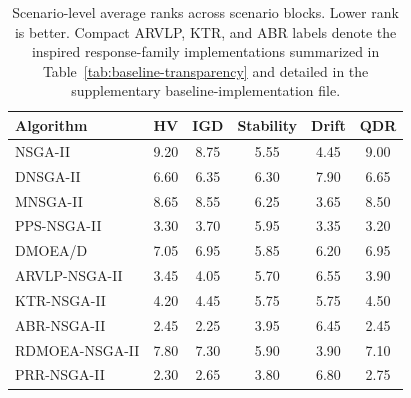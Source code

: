 \begin{table}[htbp]
\centering
\caption{Scenario-level average ranks across scenario blocks. Lower rank is better. Compact ARVLP, KTR, and ABR labels denote the inspired response-family implementations summarized in Table~\ref{tab:baseline-transparency} and detailed in the supplementary baseline-implementation file.}
\label{tab:average-ranks}
\begin{tabular}{lccccc}
\toprule
Algorithm & HV & IGD & Stability & Drift & QDR \\
\midrule
NSGA-II & 9.20 & 8.75 & 5.55 & 4.45 & 9.00 \\
DNSGA-II & 6.60 & 6.35 & 6.30 & 7.90 & 6.65 \\
MNSGA-II & 8.65 & 8.55 & 6.25 & 3.65 & 8.50 \\
PPS-NSGA-II & 3.30 & 3.70 & 5.95 & 3.35 & 3.20 \\
DMOEA/D & 7.05 & 6.95 & 5.85 & 6.20 & 6.95 \\
ARVLP-NSGA-II & 3.45 & 4.05 & 5.70 & 6.55 & 3.90 \\
KTR-NSGA-II & 4.20 & 4.45 & 5.75 & 5.75 & 4.50 \\
ABR-NSGA-II & 2.45 & 2.25 & 3.95 & 6.45 & 2.45 \\
RDMOEA-NSGA-II & 7.80 & 7.30 & 5.90 & 3.90 & 7.10 \\
PRR-NSGA-II & 2.30 & 2.65 & 3.80 & 6.80 & 2.75 \\
\bottomrule
\end{tabular}
\end{table}

\begin{table}[htbp]
\centering
\caption{Scenario-level win/tie/loss counts for PRR-NSGA-II against baselines. Compact ARVLP, KTR, and ABR labels denote the inspired response-family implementations summarized in Table~\ref{tab:baseline-transparency} and detailed in the supplementary baseline-implementation file.}
\label{tab:wtl}
\end{table}

